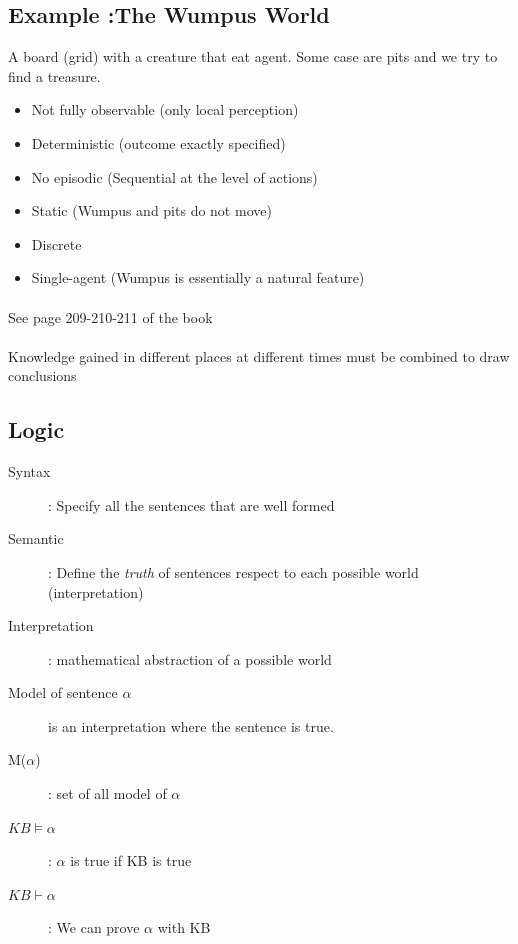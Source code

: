 \subsection{Example :The Wumpus World}
A board (grid) with a creature that eat agent. Some case are pits and we try to find a treasure. 
\begin{itemize}
    \item Not fully observable (only local perception)
    \item Deterministic (outcome exactly specified)
    \item No episodic  (Sequential at the level of actions)
    \item Static (Wumpus and pits do not move)
    \item Discrete
    \item Single-agent (Wumpus is essentially a natural feature)
\end{itemize}

\paragraph{ } See page 209-210-211 of the book

\paragraph{ } Knowledge gained in different places at different times must
be combined to draw conclusions


\subsection{Logic}
\begin{description}
    \item[Syntax] : Specify all the sentences that are well formed
    \item[Semantic] : Define the \textit{truth} of sentences respect to each
        possible world (interpretation)
    \item[Interpretation] : mathematical abstraction of a possible world
    \item[Model of sentence $\alpha$] is an interpretation where the sentence 
        is true. 
    \item[M($\alpha$)] : set of all model of $\alpha$
    \item[$KB \models \alpha$] : $\alpha$ is true if KB is true
    \item[$KB \vdash \alpha$] : We can prove $\alpha$ with KB
\end{description}

